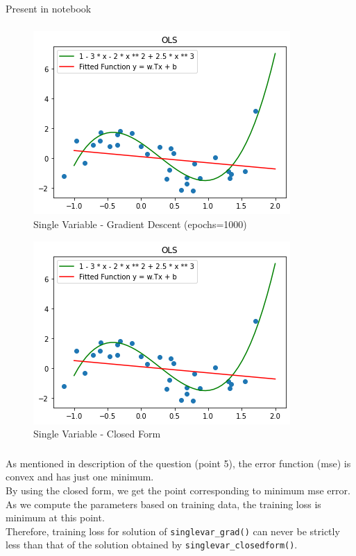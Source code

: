 \documentclass[12pt, fleqn]{article}
\begin{document}
\subsubsection{}
Present in notebook

\subsubsection{}
\begin{figure}[H]
  \centering
  \includegraphics[scale=0.6]{singlevar_grad.png}
  \caption{Single Variable - Gradient Descent (epochs=1000)}
\end{figure}
\begin{figure}[H]
  \centering
  \includegraphics[scale=0.6]{singlevar_grad.png}
  \caption{Single Variable - Closed Form}
\end{figure}

\subsubsection{}
As mentioned in description of the question (point 5), the error function (mse) is convex and has just one minimum. \\
By using the closed form, we get the point corresponding to minimum mse error. As we compute the parameters based on training data, the training loss is minimum at this point. \\
Therefore, training loss for solution of \verb!singlevar_grad()! can never be strictly less than that of the solution obtained by \verb!singlevar_closedform()!.
\end{document}

